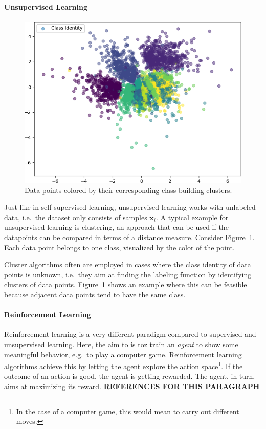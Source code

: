 \paragraph{Unsupervised Learning}
\begin{figure}
    \centering
    \includegraphics[width=.48\textwidth]{images/latent_spaces/mnist/vae/embeddings_mu_6.png}
    \caption[Clusters of data points]{Data points colored by their corresponding class building clusters.}
    \label{fig:clustering_example}
\end{figure}
Just like in self-supervised learning, unsupervised learning works with unlabeled data, i.e.~the dataset only consists of samples $\bm{x}_i$.
A typical example for unsupervised learning is clustering, an approach that can be used if the datapoints can be compared in terms of a distance measure.
Consider Figure~\ref{fig:clustering_example}.
Each data point belongs to one class, visualized by the color of the point.

Cluster algorithms often are employed in cases where the class identity of data points is unknown, i.e.~they aim at finding the labeling function by identifying clusters of data points.
Figure~\ref{fig:clustering_example} shows an example where this can be feasible because adjacent data points tend to have the same class.

\paragraph{Reinforcement Learning}
Reinforcement learning is a very different paradigm compared to supervised and unsupervised learning.
Here, the aim to is toz train an \textit{agent} to show some meaningful behavior, e.g.~to play a computer game.
Reinforcement learning algorithms achieve this by letting the agent explore the action space\footnote{In the case of a computer game, this would mean to carry out different moves.}.
If the outcome of an action is good, the agent is getting rewarded.
The agent, in turn, aims at maximizing its reward. \textbf{REFERENCES FOR THIS PARAGRAPH}

